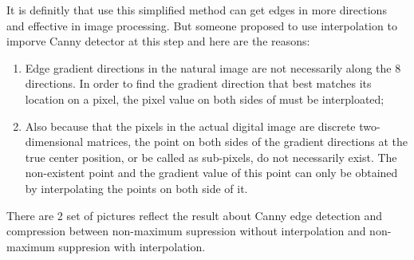 \documentclass[10pt,twocolumn,letterpaper]{article}
\begin{document}
It is definitly that use this simplified method can get edges in more directions and effective 
in image processing. But someone proposed to use interpolation to imporve Canny detector at 
this step and here are the reasons: 
\begin{enumerate}[label={\alph*)}]
\item Edge gradient directions in the natural image are not necessarily along the 8 directions.
In order to find the gradient direction that best matches its location on a pixel, the 
pixel value on both sides of must be interploated; 
\item Also because that the pixels in the actual digital image are discrete two-dimensional 
matrices, the point on both sides of the gradient directions at the true center position, or 
be called as sub-pixels, do not necessarily exist. The non-existent point and the gradient 
value of this point can only be obtained by interpolating the points on both side of it.
\end{enumerate}

There are 2 set of pictures reflect the result about Canny edge detection and compression 
between non-maximum supression without interpolation and non-maximum suppresion 
with interpolation. 
\end{document}
